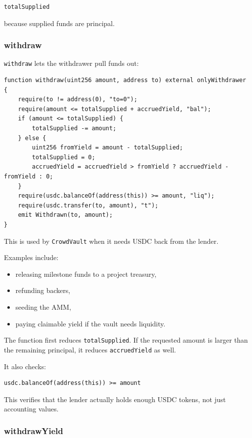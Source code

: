 \documentclass[11pt,a4paper]{article}
\begin{document}
\begin{lstlisting}
totalSupplied
\end{lstlisting}

because supplied funds are principal.

\subsubsection{withdraw}

\texttt{withdraw} lets the withdrawer pull funds out:

\begin{lstlisting}
function withdraw(uint256 amount, address to) external onlyWithdrawer {
    require(to != address(0), "to=0");
    require(amount <= totalSupplied + accruedYield, "bal");
    if (amount <= totalSupplied) {
        totalSupplied -= amount;
    } else {
        uint256 fromYield = amount - totalSupplied;
        totalSupplied = 0;
        accruedYield = accruedYield > fromYield ? accruedYield - fromYield : 0;
    }
    require(usdc.balanceOf(address(this)) >= amount, "liq");
    require(usdc.transfer(to, amount), "t");
    emit Withdrawn(to, amount);
}
\end{lstlisting}

This is used by \texttt{CrowdVault} when it needs USDC back from the lender.

Examples include:

\begin{itemize}
  \item releasing milestone funds to a project treasury,
  \item refunding backers,
  \item seeding the AMM,
  \item paying claimable yield if the vault needs liquidity.
\end{itemize}

The function first reduces \texttt{totalSupplied}. If the requested amount is larger than the remaining principal, it reduces \texttt{accruedYield} as well.

It also checks:

\begin{lstlisting}
usdc.balanceOf(address(this)) >= amount
\end{lstlisting}

This verifies that the lender actually holds enough USDC tokens, not just accounting values.

\subsubsection{withdrawYield}
\end{document}
